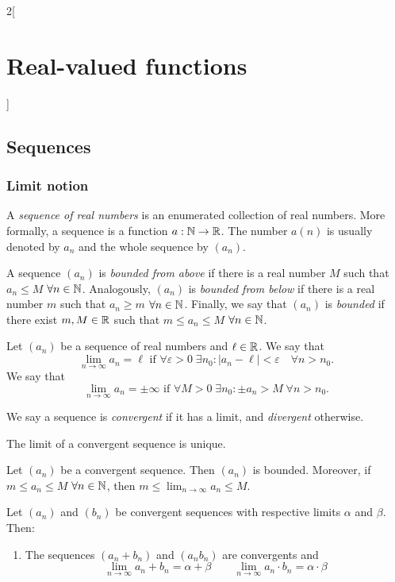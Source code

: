 \documentclass[../../../main.tex]{subfiles}
\begin{document}
\begin{multicols}{2}[\section{Real-valued functions}]
\subsection{Sequences}
\subsubsection*{Limit notion}
\begin{definition}
    A \textit{sequence of real numbers} is an enumerated collection of real numbers. More formally, a sequence is a function $a:\mathbb{N}\rightarrow\mathbb{R}$. The number $a(n)$ is usually denoted by $a_n$ and the whole sequence by $(a_n)$. 
\end{definition}
\begin{definition}
    A sequence $(a_n)$ is \textit{bounded from above} if there is a real number $M$ such that $a_n\leq M$ $\forall n\in\mathbb{N}$.
    Analogously, $(a_n)$ is \textit{bounded from below} if there is a real number $m$ such that $a_n\geq m$ $\forall n\in\mathbb{N}$. 
    Finally, we say that $(a_n)$ is \textit{bounded} if there exist $m,M\in\mathbb{R}$ such that $m\leq a_n\leq M$ $\forall n\in\mathbb{N}$.
\end{definition}
\begin{definition}[Limit]
    Let $(a_n)$ be a sequence of real numbers and $\ell\in\mathbb{R}$. We say that $$\lim_{n\to\infty} a_n=\ell\text{ if }\forall\varepsilon>0\;\exists n_0:|a_n-\ell|<\varepsilon\quad\forall n>n_0.$$
    We say that $$\lim_{n\to\infty} a_n=\pm\infty\text{ if }\forall M>0\;\exists n_0:\pm a_n>M\;\forall n>n_0.$$
\end{definition}
\begin{definition}
    We say a sequence is \textit{convergent} if it has a limit, and \textit{divergent} otherwise.
\end{definition}
\begin{lemma}
    The limit of a convergent sequence is unique.
\end{lemma}
\begin{lemma}
    Let $(a_n)$ be a convergent sequence. Then $(a_n)$ is bounded. Moreover, if $m\leq a_n\leq M$ $\forall n\in\mathbb{N}$, then $\displaystyle m\leq \lim_{n\to\infty} a_n\leq M$.
\end{lemma}
\begin{lemma}
    Let $(a_n)$ and $(b_n)$ be convergent sequences with respective limits $\alpha$ and $\beta$. Then:
    \begin{enumerate}
        \item The sequences $(a_n+b_n)$ and $(a_nb_n)$ are convergents and $$\lim_{n\to\infty} a_n+b_n=\alpha+\beta\qquad\lim_{n\to\infty} a_n\cdot b_n=\alpha\cdot \beta$$

\end{enumerate}
\end{lemma}
\end{multicols}
\end{document}
